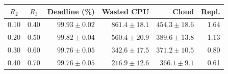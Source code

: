 \begin{tabular}{@{}ccrrrr@{}}
\toprule
$R_2$ & $R_3$ & Deadline (\%) & Wasted CPU & Cloud & Repl. \\
\midrule
0.10 & 0.40 & $99.93 \pm 0.02$ & $861.4 \pm 18.1$ & $454.3 \pm 18.6$ & 1.64 \\
0.20 & 0.50 & $99.82 \pm 0.04$ & $560.4 \pm 20.9$ & $389.6 \pm 13.8$ & 1.13 \\
0.30 & 0.60 & $99.76 \pm 0.05$ & $342.6 \pm 17.5$ & $371.2 \pm 10.5$ & 0.80 \\
0.40 & 0.70 & $99.76 \pm 0.05$ & $216.9 \pm 12.6$ & $366.1 \pm 9.1$ & 0.61 \\
\bottomrule
\end{tabular}
